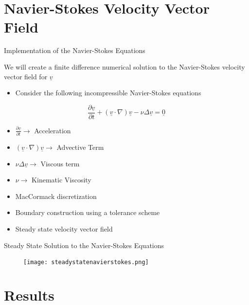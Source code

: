 \documentclass[10pt]{beamer}
\begin{document}
\section{Navier-Stokes Velocity Vector Field}
\begin{frame} {Implementation of the Navier-Stokes Equations}\label{NavierStokesSlide}

We will create a finite difference numerical solution to the Navier-Stokes velocity vector field for $\underline{v}$

\begin{itemize}
\item Consider the following incompressible Navier-Stokes equations
\end{itemize}

\begin{equation}
\frac{\partial \underline{v}}{\partial t}+\left(\underline{v}\cdot \nabla \right)\underline{v}-\nu \Delta \underline{v} = \underline{0}
\end{equation}

\begin{itemize}
\item $\frac{\partial \underline{v}}{\partial t} \rightarrow$ Acceleration
\item $\left(\underline{v}\cdot \nabla \right)\underline{v} \rightarrow$ Advective Term
\item $\nu \Delta \underline{v} \rightarrow$ Viscous term
\item $\nu \rightarrow$ Kinematic Viscosity
\item<1-> MacCormack discretization
\item Boundary construction using a tolerance scheme
\item Steady state velocity vector field
\end{itemize}
\hyperlink{Questions}{}
\end{frame}

\begin{frame} {Steady State Solution to the Navier-Stokes Equations} \label{NavierStokesSteadyState}

\begin{figure}
\centering   
   \texttt{[image: steadystatenavierstokes.png]}
   
\end{figure}
\hyperlink{Questions}{}
\end{frame}



\section{Results}
\end{document}

